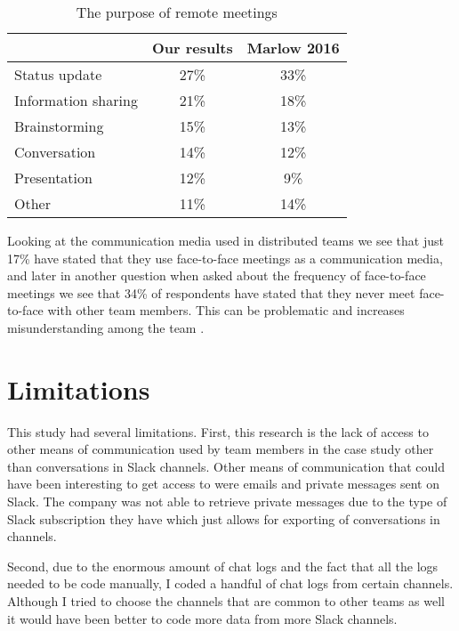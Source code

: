 \begin{table}
\centering
\caption{The purpose of remote meetings} \label{table:remotepurpose}
\begin{tabular}{lcc}
\hline
& \textbf{Our results} & \textbf{Marlow 2016} \\ \hline
Status update&27\%&33\%\\
Information sharing&21\%&18\%\\
Brainstorming&	15\%&	13\%\\
Conversation&	14\%&	12\%\\
Presentation&	12\%&	9\%\\
Other&	11\%&	14\%\\
\hline
\end{tabular}
\end{table}

Looking at the communication media used in distributed teams we see that just 17\% have stated that they use face-to-face meetings as a communication media, and later in another question when asked about the frequency of face-to-face meetings we see that 34\% of respondents have stated that they never meet face-to-face with other team members. This can be problematic and increases misunderstanding among the team \citep{Curtis1988}.

\chapter{Limitations}

This study had several limitations. First, this research is the lack of access to other means of communication used by team members in the case study other than conversations in Slack channels. Other means of communication that could have been interesting to get access to were emails and private messages sent on Slack. The company was not able to retrieve private messages due to the type of Slack subscription they have which just allows for exporting of conversations in channels.

Second, due to the enormous amount of chat logs and the fact that all the logs needed to be code manually, I coded a handful of chat logs from certain channels. Although I tried to choose the channels that are common to other teams as well it would have been better to code more data from more Slack channels. 

